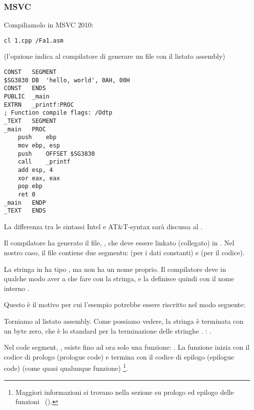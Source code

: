 \subsubsection{MSVC}

Compiliamolo in MSVC 2010:

\begin{lstlisting}
cl 1.cpp /Fa1.asm
\end{lstlisting}

(l'opzione  indica al compilatore di generare un file con il listato assembly)

\begin{lstlisting}[caption=MSVC 2010,style=customasmx86]
CONST	SEGMENT
$SG3830	DB	'hello, world', 0AH, 00H
CONST	ENDS
PUBLIC	_main
EXTRN	_printf:PROC
; Function compile flags: /Odtp
_TEXT	SEGMENT
_main	PROC
	push	ebp
	mov	ebp, esp
	push	OFFSET $SG3830
	call	_printf
	add	esp, 4
	xor	eax, eax
	pop	ebp
	ret	0
_main	ENDP
_TEXT	ENDS
\end{lstlisting}

\ITAph{}
La differenza tra le sintassi Intel e AT\&T-syntax sarà discussa al .

Il compilatore ha generato il file, , che deve essere linkato (collegato) in .
Nel nostro caso, il file contiene due segmentu:  (per i dati constanti) e  (per il codice).

\label{string_is_const_char}
La stringa  in \CCpp ha tipo , ma non ha un nome proprio.
Il compilatore deve in qualche modo aver a che fare con la stringa, e la definisce quindi con il nome interno .

Questo è il motivo per cui l'esempio potrebbe essere riscritto nel modo seguente:



Torniamo al listato assembly. Come possiamo vedere, la stringa è terminata con un byte zero, che è lo standard per la terminazione delle stringhe \CCpp.
\ITAph{}: .

Nel code segment, , esiste fino ad ora solo una funzione: \main{}.
La funzione \main inizia con il codice di prologo (prologue code) e termina con il codice di epilogo (epilogue code) (come quasi qualunque funzione)
\footnote{Maggiori informazioni si trovano nella sezione su prologo ed epilogo delle funzioni ~().}.

